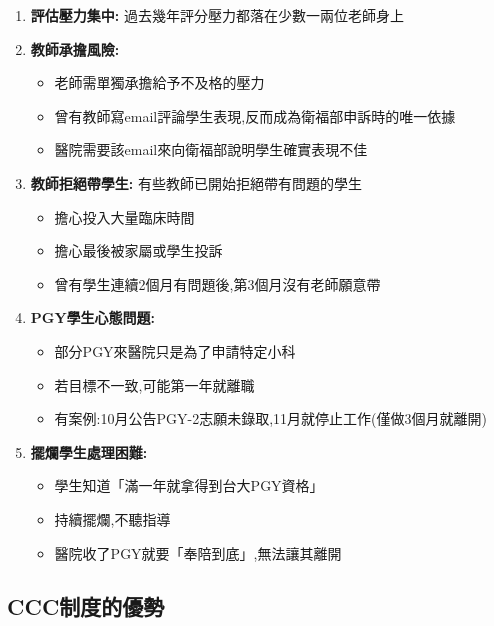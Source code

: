 \documentclass[12pt,a4paper]{article}
\begin{document}
\begin{enumerate}[leftmargin=*]
    \item \textbf{評估壓力集中:} 過去幾年評分壓力都落在少數一兩位老師身上
    \item \textbf{教師承擔風險:} 
    \begin{itemize}
        \item 老師需單獨承擔給予不及格的壓力
        \item 曾有教師寫email評論學生表現,反而成為衛福部申訴時的唯一依據
        \item 醫院需要該email來向衛福部說明學生確實表現不佳
    \end{itemize}
    \item \textbf{教師拒絕帶學生:} 有些教師已開始拒絕帶有問題的學生
    \begin{itemize}
        \item 擔心投入大量臨床時間
        \item 擔心最後被家屬或學生投訴
        \item 曾有學生連續2個月有問題後,第3個月沒有老師願意帶
    \end{itemize}
    \item \textbf{PGY學生心態問題:}
    \begin{itemize}
        \item 部分PGY來醫院只是為了申請特定小科
        \item 若目標不一致,可能第一年就離職
        \item 有案例:10月公告PGY-2志願未錄取,11月就停止工作(僅做3個月就離開)
    \end{itemize}
    \item \textbf{擺爛學生處理困難:}
    \begin{itemize}
        \item 學生知道「滿一年就拿得到台大PGY資格」
        \item 持續擺爛,不聽指導
        \item 醫院收了PGY就要「奉陪到底」,無法讓其離開
    \end{itemize}
\end{enumerate}

\subsection{CCC制度的優勢}
\end{document}
